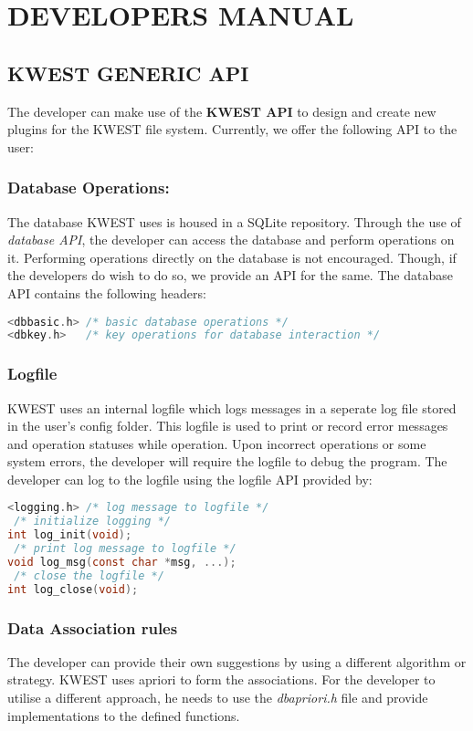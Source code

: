 \newpage

\setcounter{section}{0}
\chapter*{DEVELOPERS MANUAL}

\section {KWEST GENERIC API}
The developer can make use of the \textbf{KWEST API} to design and create new plugins for the KWEST file system. Currently, we offer the following API to the user:

\subsection{Database Operations:}
The database KWEST uses is housed in a SQLite repository. Through the use of \textit{database API}, the developer can access the database and perform operations on it. Performing operations directly on the database is not encouraged. Though, if the developers do wish to do so, we provide an API for the same. The database API contains the following headers:
\begin{lstlisting}[language=C,frame=single]
<dbbasic.h> /* basic database operations */
<dbkey.h>   /* key operations for database interaction */
\end{lstlisting}

\subsection{Logfile}
KWEST uses an internal logfile which logs messages in a seperate log file stored in the user's config folder. This logfile is used to print or record error messages and operation statuses while operation. Upon incorrect operations or some system errors, the developer will require the logfile to debug the program. The developer can log to the logfile using the logfile API provided by:
\begin{lstlisting}[language=C,frame=single]
<logging.h> /* log message to logfile */
 /* initialize logging */
int log_init(void); 
 /* print log message to logfile */
void log_msg(const char *msg, ...); 
 /* close the logfile */
int log_close(void);
\end{lstlisting}

\subsection{Data Association rules}
The developer can provide their own suggestions by using a different algorithm or strategy. KWEST uses apriori to form the associations. For the developer to utilise a different approach, he needs to use the \textit{dbapriori.h} file and provide implementations to the defined functions.

